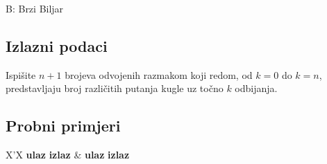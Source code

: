 \begin{statement}[
  timelimit=2 s,
  memorylimit=512 MiB,
]{B: Brzi Biljar}
\subsection*{Izlazni podaci}
Ispišite $n+1$ brojeva odvojenih razmakom koji redom, od $k=0$ do $k=n$,
predstavljaju broj različitih putanja kugle uz točno $k$ odbijanja.

\subsection*{Probni primjeri}
\begin{tabularx}{\textwidth}{X'X}
  \textbf{ulaz}
  \linespread{1}{}
  \textbf{izlaz}
  \linespread{1}{} &
  \textbf{ulaz}
  \linespread{1}{}
  \textbf{izlaz}
  \linespread{1}{}
\end{tabularx}

\end{statement}

